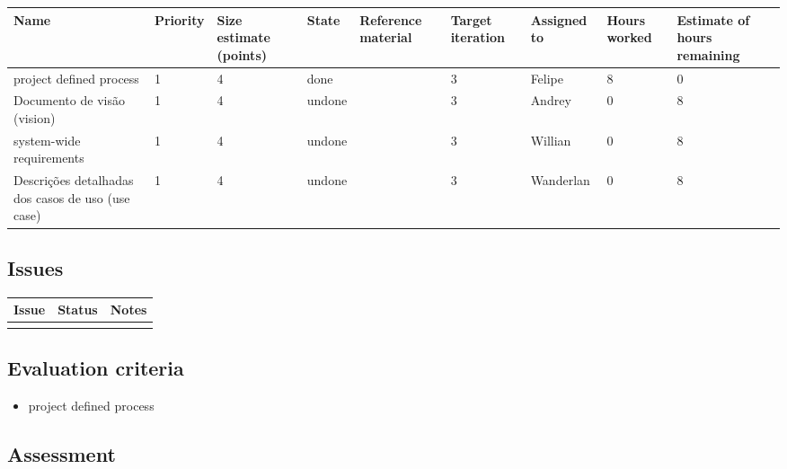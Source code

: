 \begin{adjustbox}{width=\textwidth}
\noindent\begin{tabular}{|l|l|l|l|l|l|l|l|l|}
\hline
Name & Priority & Size estimate (points) & State & Reference material & Target iteration & Assigned to & Hours worked & Estimate of hours remaining \\ \hline
project defined process &  1 & 4 & done & & 3 & Felipe & 8 & 0 \\ \hline
Documento de visão (vision) & 1 & 4 & undone & & 3 & Andrey & 0 & 8 \\ \hline
system-wide requirements & 1 & 4 & undone & & 3 & Willian & 0 & 8 \\ \hline
Descrições detalhadas dos casos de uso (use case) & 1 & 4 & undone & & 3 & Wanderlan & 0 & 8 \\ \hline
\end{tabular}
\end{adjustbox}

\subsection*{Issues}


\noindent\begin{tabular}{|l|l|l|}
\hline
Issue & Status & Notes \\
\hline
 &  & \\
\hline
\end{tabular}

\subsection*{Evaluation criteria}


\begin{itemize}
	\item project defined process 
\end{itemize}

\subsection*{Assessment}

